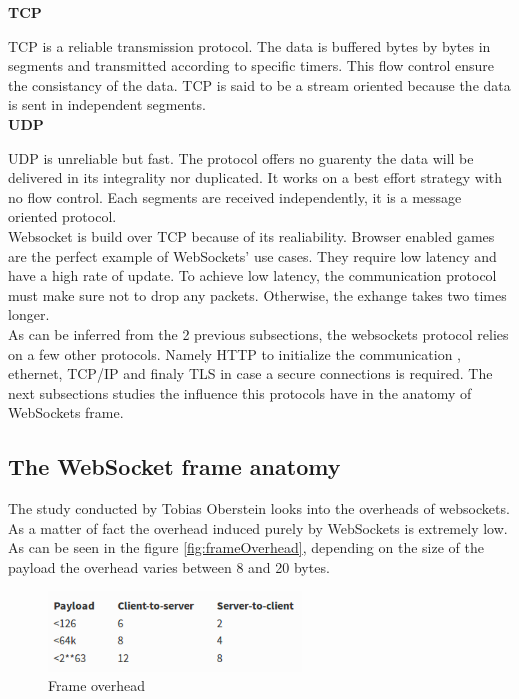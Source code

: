 \textbf{TCP}

TCP is a reliable transmission protocol. The data is buffered bytes by bytes in
segments and transmitted according to specific timers. This flow control
ensure the consistancy of the data. TCP is said to be a stream oriented
because the data is sent in independent segments.\\

\textbf{UDP}

UDP is unreliable but fast. The protocol offers no guarenty the data will be
delivered in its integrality nor duplicated. It works on a best effort strategy
with no flow control. Each segments are received independently, it is a message
oriented protocol.\\

Websocket is build over TCP because of its realiability. Browser enabled games
are the perfect example of WebSockets' use cases. They require low latency and
have a high rate of update. To achieve low latency, the communication protocol
must make sure not to drop any packets. Otherwise, the exhange takes two times
longer.\\

As can be inferred from the 2 previous subsections, the websockets protocol
relies on a few other protocols. Namely HTTP to initialize the communication ,
ethernet, TCP/IP and finaly TLS in case a secure connections is required.  The
next subsections studies the influence this protocols have in the anatomy of
WebSockets frame.\\

\subsection{The WebSocket frame anatomy}

The study conducted by Tobias Oberstein \citep{Reference30} looks into the
overheads of websockets. As a matter of fact the overhead induced purely by
WebSockets is extremely low. As can be seen in the figure
\ref{fig:frameOverhead}, depending on the size of the payload the overhead
varies between 8 and 20 bytes.\\

\begin{figure}[H]
\centering
\includegraphics[width=0.6\textwidth]{./Figures/frame_overhead.png}
\caption[Frame overhead]{Frame overhead \citep{Reference30}}
\label{fig:frame_overhead}
\end{figure}

